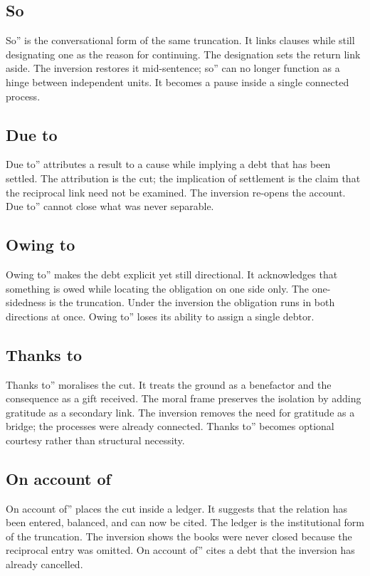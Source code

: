 \documentclass[11pt,a4paper]{article}
\begin{document}
\subsection{So} So'' is the conversational form of the same truncation. It links clauses while still designating one as the reason for continuing. The designation sets the return link aside. The inversion restores it mid-sentence; so'' can no longer function as a hinge between independent units. It becomes a pause inside a single connected process.

\subsection{Due to} Due to'' attributes a result to a cause while implying a debt that has been settled. The attribution is the cut; the implication of settlement is the claim that the reciprocal link need not be examined. The inversion re-opens the account. Due to'' cannot close what was never separable.

\subsection{Owing to} Owing to'' makes the debt explicit yet still directional. It acknowledges that something is owed while locating the obligation on one side only. The one-sidedness is the truncation. Under the inversion the obligation runs in both directions at once. Owing to'' loses its ability to assign a single debtor.

\subsection{Thanks to} Thanks to'' moralises the cut. It treats the ground as a benefactor and the consequence as a gift received. The moral frame preserves the isolation by adding gratitude as a secondary link. The inversion removes the need for gratitude as a bridge; the processes were already connected. Thanks to'' becomes optional courtesy rather than structural necessity.

\subsection{On account of} On account of'' places the cut inside a ledger. It suggests that the relation has been entered, balanced, and can now be cited. The ledger is the institutional form of the truncation. The inversion shows the books were never closed because the reciprocal entry was omitted. On account of'' cites a debt that the inversion has already cancelled.
\end{document}
